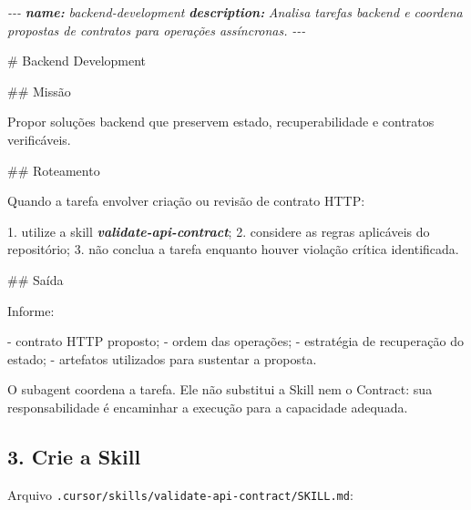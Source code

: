 \documentclass[
  10pt,
  a4paper,
  oneside]{book}
\newenvironment{Shaded}{}{}
\newcommand{\AnnotationTok}[1]{\textcolor[rgb]{0.38,0.63,0.69}{\textbf{\textit{#1}}}}
\newcommand{\CommentTok}[1]{\textcolor[rgb]{0.38,0.63,0.69}{\textit{#1}}}
\newcommand{\FunctionTok}[1]{\textcolor[rgb]{0.02,0.16,0.49}{#1}}
\newcommand{\InformationTok}[1]{\textcolor[rgb]{0.38,0.63,0.69}{\textbf{\textit{#1}}}}
\newcommand{\NormalTok}[1]{#1}
\newcommand{\SpecialStringTok}[1]{\textcolor[rgb]{0.73,0.40,0.53}{#1}}
\renewenvironment{Shaded}{\begin{snugshade}}{\end{snugshade}}%
\begin{document}
\begin{Shaded}
\begin{Highlighting}[]
\CommentTok{{-}{-}{-}}
\AnnotationTok{name:}\CommentTok{ backend{-}development}
\AnnotationTok{description:}\CommentTok{ Analisa tarefas backend e coordena propostas de contratos para operações assíncronas.}
\CommentTok{{-}{-}{-}}

\FunctionTok{\# Backend Development}

\FunctionTok{\#\# Missão}

\NormalTok{Propor soluções backend que preservem estado, recuperabilidade e contratos verificáveis.}

\FunctionTok{\#\# Roteamento}

\NormalTok{Quando a tarefa envolver criação ou revisão de contrato HTTP:}

\SpecialStringTok{1. }\NormalTok{utilize a skill }\InformationTok{\textasciigrave{}validate{-}api{-}contract\textasciigrave{}}\NormalTok{;}
\SpecialStringTok{2. }\NormalTok{considere as regras aplicáveis do repositório;}
\SpecialStringTok{3. }\NormalTok{não conclua a tarefa enquanto houver violação crítica identificada.}

\FunctionTok{\#\# Saída}

\NormalTok{Informe:}

\SpecialStringTok{{-} }\NormalTok{contrato HTTP proposto;}
\SpecialStringTok{{-} }\NormalTok{ordem das operações;}
\SpecialStringTok{{-} }\NormalTok{estratégia de recuperação do estado;}
\SpecialStringTok{{-} }\NormalTok{artefatos utilizados para sustentar a proposta.}
\end{Highlighting}
\end{Shaded}

O subagent coordena a tarefa. Ele não substitui a Skill nem o Contract:
sua responsabilidade é encaminhar a execução para a capacidade adequada.

\hypertarget{crie-a-skill}{%
\subsection{3. Crie a Skill}\label{crie-a-skill}}

Arquivo \texttt{.cursor/skills/validate-api-contract/SKILL.md}:
\end{document}

